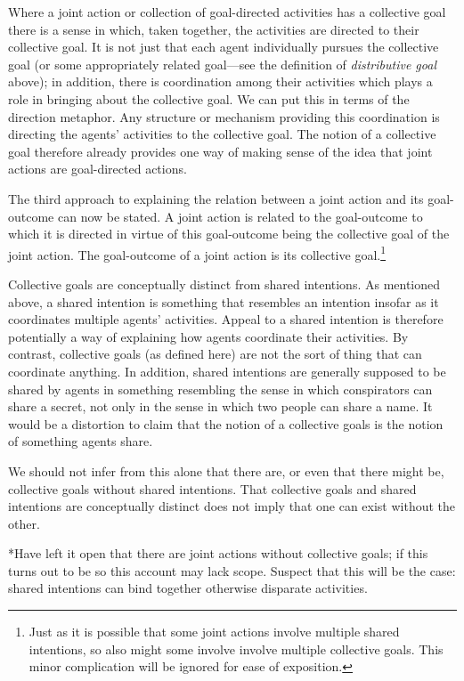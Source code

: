 \documentclass[12pt,a4paper]{extarticle}
\begin{document}
Where a joint action or collection of goal-directed activities has a collective goal there is a sense in which, taken together, the activities are directed to their collective goal.  It is not just that each agent individually pursues the collective goal (or some appropriately related goal---see the definition of \emph{distributive goal} above); in addition, there is coordination among their activities which plays a role in bringing about the collective goal.  We can put this in terms of the direction metaphor.  Any structure or mechanism providing this coordination is directing the agents' activities to the collective goal.  The notion of a collective goal therefore already provides one way of making sense of the idea that joint actions are goal-directed actions.

The third approach to explaining the relation between a joint action and its goal-outcome can now be stated.  A joint action is related to the goal-outcome to which it is directed in virtue of this goal-outcome being the collective goal of the joint action.  The goal-outcome of a joint action is its collective goal.\footnote{  
Just as it is possible that some joint actions involve multiple shared intentions, so also might some involve involve multiple collective goals.  This minor complication will be ignored for ease of exposition.
}

Collective goals are conceptually distinct from shared intentions.  As mentioned above, a shared intention is something that resembles an intention insofar as it coordinates multiple agents' activities.  Appeal to a shared intention is therefore potentially a way of explaining how agents coordinate their activities.  By contrast, collective goals (as defined here) are not the sort of thing that can coordinate anything.  In addition, shared intentions are generally supposed to be shared by agents in something resembling the sense in which conspirators can share a secret, not only in the sense in which two people can share a name.  It would be a distortion to claim that the notion of a collective goals is the notion of something agents share.

We should not infer from this alone that there are, or even that there might be, collective goals without shared intentions.  That collective goals and shared intentions are conceptually distinct does not imply that one can exist without the other.

*Have left it open that there are joint actions without collective goals; if this turns out to be so this account may lack scope.  Suspect that this will be the case: shared intentions can bind together otherwise disparate activities.
\end{document}
